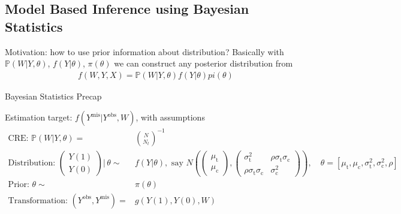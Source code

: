 \subsection{Model Based Inference using Bayesian Statistics}
Motivation: how to use prior information about distribution? Basically with $ \mathbb{P}\left( W|Y,\theta  \right)  $, $ f(Y|\theta ) $, $ \pi(\theta ) $ we can construct any posterior distribution from 
\begin{align}
    f(W,Y,X)= \mathbb{P}\left( W|Y,\theta  \right)f(Y|\theta )pi(\theta )
\end{align}


\begin{point}
    Bayesian Statistics Precap
\end{point}

Estimation target: $ f(Y^\mathrm{mis}|Y^\mathrm{obs},W ) $, with assumptions
\begin{align}
    \text{CRE: }\mathbb{P}\left( W|Y,\theta  \right)=&\binom{N}{N_t} ^{-1}\\
    \text{Distribution: }\begin{pmatrix}
        Y(1)\\
        Y(0)
    \end{pmatrix}\Big|\,\theta \sim & f(Y|\theta ),\text{ say } N\left(\begin{pmatrix}
        \mu _\mathrm{t}\\
        \mu _\mathrm{c}      
    \end{pmatrix},\begin{pmatrix}
        \sigma _\mathrm{t}^2& \rho \sigma_\mathrm{t}\sigma _\mathrm{c}\\
        \rho \sigma _\mathrm{t}  \sigma _\mathrm{c}&\sigma _\mathrm{c}^2     
    \end{pmatrix}\right),\quad \theta =[\mu _\mathrm{t},\mu _\mathrm{c} ,\sigma^2_\mathrm{t},\sigma ^2_\mathrm{c} ,\rho ]\\
    \text{Prior: }\theta \sim & \pi (\theta  )\\
    \text{Transformation: }(Y^\mathrm{obs},Y^\mathrm{mis}  )=&g\left(Y(1),Y(0),W\right)
\end{align}

